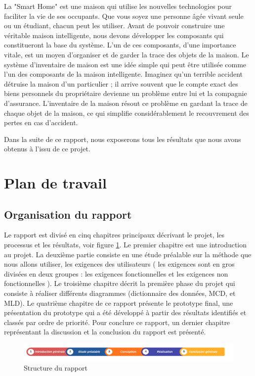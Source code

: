 La "Smart Home" est une maison qui utilise les nouvelles technologies pour faciliter la vie de ses occupants. Que vous soyez une personne âgée vivant seule ou un étudiant, chacun peut les utiliser. Avant de pouvoir construire une véritable maison intelligente, nous devons développer les composants qui constitueront la base du système. L'un de ces composants, d'une importance vitale, est un moyen d'organiser et de garder la trace des objets de la maison. Le système d’inventaire de maison est une idée simple qui peut être utilisée comme l'un des composants de la maison intelligente. Imaginez qu'un terrible accident détruise la maison d'un particulier ; il arrive souvent que le compte exact des biens personnels du propriétaire devienne un problème entre lui et la compagnie d'assurance. L'inventaire de la maison résout ce problème en gardant la trace de chaque objet de la maison, ce qui simplifie considérablement le recouvrement des pertes en cas d'accident.

Dans la suite de ce rapport, nous exposerons tous les résultats que nous avons obtenus à l’issu de ce projet.

\section{Plan de travail}
\subsection{Organisation du rapport}
Le rapport est divisé en cinq chapitres principaux décrivant le projet, les processus et les résultats, voir figure \ref{fig:structure}. Le premier chapitre est une introduction au projet. La deuxième partie consiste en une étude préalable sur la méthode que nous allons utiliser, les exigences des utilisateurs ( les exigences sont en gros divisées en deux groupes : les exigences fonctionnelles et les exigences non fonctionnelles ). Le troisième chapitre décrit la première phase du projet qui consiste à réaliser différents diagrammes (dictionnaire des données, MCD, et MLD). Le quatrième chapitre de ce rapport présente le prototype final, une présentation du prototype qui a été développé à partir des résultats identifiés et classés par ordre de priorité.  Pour conclure ce rapport, un dernier chapitre représentant la discussion et la conclusion du rapport est présenté.

\begin{figure}[ht]
    \centering
    \includegraphics[keepaspectratio=true,scale=0.65]{Figures/structure-rapport.pdf}
    \caption{Structure du rapport}
    \label{fig:structure}
\end{figure}

